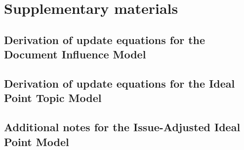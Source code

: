 \chapter{Supplementary materials}

\label{chapter:supplementary_materials}

\section{Derivation of update equations for the Document Influence Model}


\section{Derivation of update equations for the Ideal Point Topic Model}


\section{Additional notes for the Issue-Adjusted Ideal Point Model}







